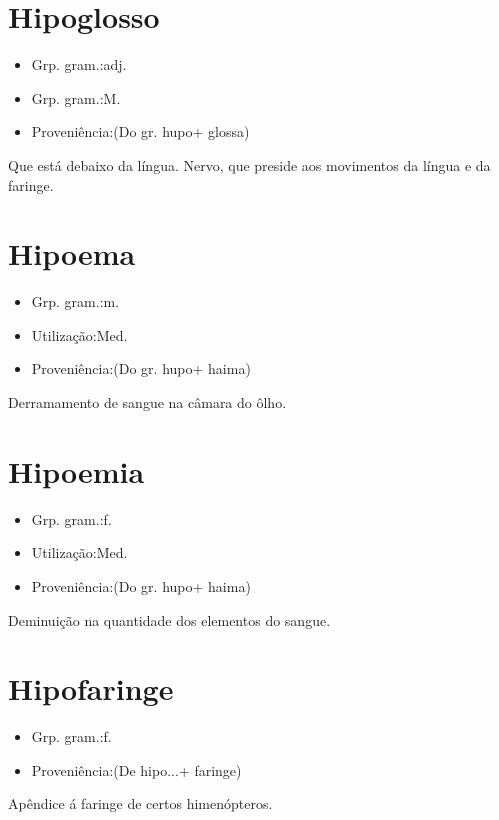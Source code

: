 \documentclass{article}
\begin{document}
\section{Hipoglosso}
\begin{itemize}
\item {Grp. gram.:adj.}
\end{itemize}
\begin{itemize}
\item {Grp. gram.:M.}
\end{itemize}
\begin{itemize}
\item {Proveniência:(Do gr. \textunderscore hupo\textunderscore  + \textunderscore glossa\textunderscore )}
\end{itemize}
Que está debaixo da língua.
Nervo, que preside aos movimentos da língua e da faringe.
\section{Hipoema}
\begin{itemize}
\item {Grp. gram.:m.}
\end{itemize}
\begin{itemize}
\item {Utilização:Med.}
\end{itemize}
\begin{itemize}
\item {Proveniência:(Do gr. \textunderscore hupo\textunderscore  + \textunderscore haima\textunderscore )}
\end{itemize}
Derramamento de sangue na câmara do ôlho.
\section{Hipoemia}
\begin{itemize}
\item {Grp. gram.:f.}
\end{itemize}
\begin{itemize}
\item {Utilização:Med.}
\end{itemize}
\begin{itemize}
\item {Proveniência:(Do gr. \textunderscore hupo\textunderscore  + \textunderscore haima\textunderscore )}
\end{itemize}
Deminuição na quantidade dos elementos do sangue.
\section{Hipofaringe}
\begin{itemize}
\item {Grp. gram.:f.}
\end{itemize}
\begin{itemize}
\item {Proveniência:(De \textunderscore hipo...\textunderscore  + \textunderscore faringe\textunderscore )}
\end{itemize}
Apêndice á faringe de certos himenópteros.
\end{document}
